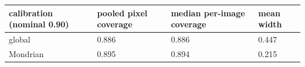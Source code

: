 \begin{tabular}{llll}
\toprule
calibration (nominal 0.90) & pooled pixel coverage & median per-image coverage & mean width \\
\midrule
global & 0.886 & 0.886 & 0.447 \\
Mondrian & 0.895 & 0.894 & 0.215 \\
\bottomrule
\end{tabular}
